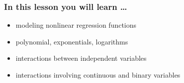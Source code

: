 

\begin{frame}
  \frametitle{In this lesson you will learn \dots}
  \begin{itemize}
  \item modeling nonlinear regression functions
  \item polynomial, exponentials, logarithms
  \item interactions between independent variables
  \item interactions involving continuous and binary variables
  \end{itemize}
\end{frame}


